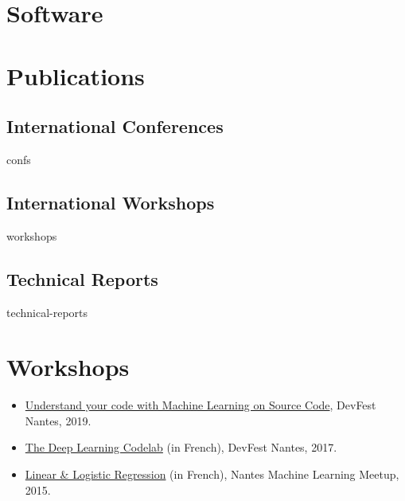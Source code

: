 \documentclass[11pt,a4paper,sans]{moderncv}        %
\begin{document}
\section{Software}


\section{Publications}



\subsection{International Conferences}
\begin{btSect}{confs}
\btPrintNotCited
\end{btSect}

\subsection{International Workshops}
\begin{btSect}{workshops}
\btPrintNotCited
\end{btSect}

\subsection{Technical Reports}
\begin{btSect}{technical-reports}
\btPrintNotCited
\end{btSect}

\section{Workshops}

\begin{itemize}
\item \href{https://github.com/m09/deeplearning-codelab}{Understand
    your code with Machine Learning on Source Code}, DevFest Nantes,
  2019.
\item \href{https://github.com/m09/deeplearning-codelab}{The Deep
    Learning Codelab} (in French), DevFest Nantes, 2017.
\item
  \href{https://github.com/nantes-machine-learning-meetup/NMLM/tree/master/2015-10-05__r\%C3\%A9gression-lin\%C3\%A9aire-logistique}{
    Linear \& Logistic Regression} (in French), Nantes Machine
  Learning Meetup, 2015.
\end{itemize}
\end{document}
